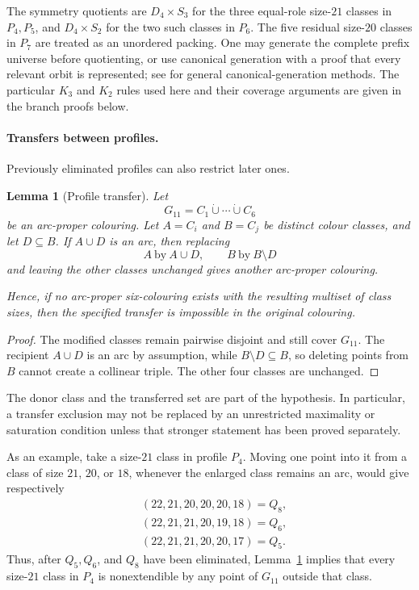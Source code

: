 \documentclass[11pt]{article}
\newtheorem{lemma}[theorem]{Lemma}
\theoremstyle{definition}
\theoremstyle{remark}
\newcommand{\Dfour}{D_4}
\begin{document}
The symmetry quotients are \(\Dfour\times S_3\) for the three equal-role
size-\(21\) classes in \(P_4,P_5\), and \(\Dfour\times S_2\) for the two
such classes in \(P_6\).  The five residual size-\(20\) classes in \(P_7\)
are treated as an unordered packing.
One may generate the complete prefix universe before quotienting, or use
canonical generation with a proof that every relevant orbit is represented;
see \cite{McKay1998} for general canonical-generation methods.
The particular \(K_3\) and \(K_2\) rules used here and their coverage
arguments are given in the branch proofs below.

\paragraph{Transfers between profiles.}
Previously eliminated profiles can also restrict later ones.

\begin{lemma}[Profile transfer]\label{lem:g11-profile-transfer}
Let
\[
  G_{11}=C_1\dot\cup\cdots\dot\cup C_6
\]
be an arc-proper colouring.  Let \(A=C_i\) and \(B=C_j\) be distinct colour
classes, and let \(D\subseteq B\).  If \(A\cup D\) is an arc, then replacing
\[
  A\ \text{by}\ A\cup D,
  \qquad
  B\ \text{by}\ B\setminus D
\]
and leaving the other classes unchanged gives another arc-proper colouring.

Hence, if no arc-proper six-colouring exists with the resulting multiset of
class sizes, then the specified transfer is impossible in the original
colouring.
\end{lemma}

\begin{proof}
The modified classes remain pairwise disjoint and still cover \(G_{11}\).
The recipient \(A\cup D\) is an arc by assumption, while
\(B\setminus D\subseteq B\), so deleting points from \(B\) cannot create a
collinear triple.  The other four classes are unchanged.
\end{proof}

The donor class and the transferred set are part of the hypothesis.  In
particular, a transfer exclusion may not be replaced by an unrestricted
maximality or saturation condition unless that stronger statement has been
proved separately.

As an example, take a size-\(21\) class in profile \(P_4\).  Moving one point
into it from a class of size \(21\), \(20\), or \(18\), whenever the enlarged
class remains an arc, would give respectively
\[
\begin{aligned}
  &(22,21,20,20,20,18)=Q_8,\\
  &(22,21,21,20,19,18)=Q_6,\\
  &(22,21,21,20,20,17)=Q_5.
\end{aligned}
\]
Thus, after \(Q_5,Q_6\), and \(Q_8\) have been eliminated,
Lemma~\ref{lem:g11-profile-transfer} implies that every size-\(21\) class in
\(P_4\) is nonextendible by any point of \(G_{11}\) outside that class.
\end{document}
